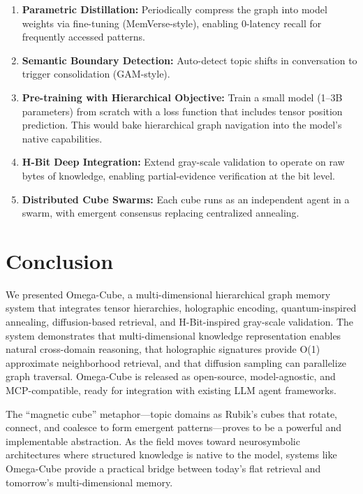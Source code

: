 \documentclass[11pt,a4paper]{article}
\begin{document}
\begin{enumerate}[leftmargin=*,itemsep=0pt]
    \item \textbf{Parametric Distillation:} Periodically compress the graph into model weights via fine-tuning (MemVerse-style), enabling 0-latency recall for frequently accessed patterns.
    \item \textbf{Semantic Boundary Detection:} Auto-detect topic shifts in conversation to trigger consolidation (GAM-style).
    \item \textbf{Pre-training with Hierarchical Objective:} Train a small model (1--3B parameters) from scratch with a loss function that includes tensor position prediction. This would bake hierarchical graph navigation into the model's native capabilities.
    \item \textbf{H-Bit Deep Integration:} Extend gray-scale validation to operate on raw bytes of knowledge, enabling partial-evidence verification at the bit level.
    \item \textbf{Distributed Cube Swarms:} Each cube runs as an independent agent in a swarm, with emergent consensus replacing centralized annealing.
\end{enumerate}

\section{Conclusion}

We presented Omega-Cube, a multi-dimensional hierarchical graph memory system that integrates tensor hierarchies, holographic encoding, quantum-inspired annealing, diffusion-based retrieval, and H-Bit-inspired gray-scale validation. The system demonstrates that multi-dimensional knowledge representation enables natural cross-domain reasoning, that holographic signatures provide O(1) approximate neighborhood retrieval, and that diffusion sampling can parallelize graph traversal. Omega-Cube is released as open-source, model-agnostic, and MCP-compatible, ready for integration with existing LLM agent frameworks.

The ``magnetic cube'' metaphor---topic domains as Rubik's cubes that rotate, connect, and coalesce to form emergent patterns---proves to be a powerful and implementable abstraction. As the field moves toward neurosymbolic architectures where structured knowledge is native to the model, systems like Omega-Cube provide a practical bridge between today's flat retrieval and tomorrow's multi-dimensional memory.
\end{document}
